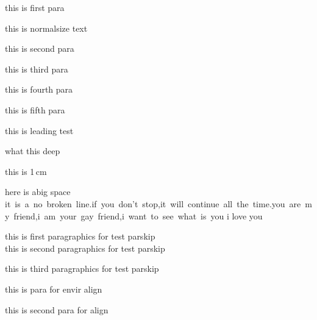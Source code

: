\documentclass[10pt]{article}
\begin{document}
    \tiny this is first para\par
    this is normalsize text\par
    \small this is second para\par
    \normalsize this is third para\par
    \large this is fourth para\par
    \huge  this is fifth para\par
    \linespread{2}\selectfont
    this is leading test\par
    what this deep\par
    this is 1\,cm\par
    here is a\hspace{1cm}big space
    \mbox{it is a no broken line.if you don't stop,it will continue all the time.you are my friend,i am your gay friend,i want to see what is you}
    i love you
    \setlength{\parskip}{10pt}
    \raggedright
    this is first paragraphics for test parskip\\
    this is second paragraphics for test parskip\par
    this is third paragraphics for test parskip
    \begin{flushright}
	    this is para for envir align

	    this is second para for align
    \end{flushright}
\end{document}
